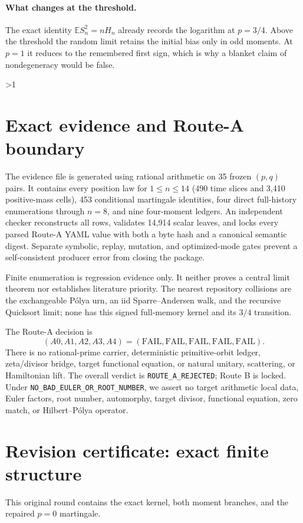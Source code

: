 \documentclass[9pt]{extarticle}
\newcommand{\E}{\mathbb E}
\begin{document}
\paragraph{What changes at the threshold.}
The exact identity $\E S_n^2=nH_n$ already records the logarithm at
$p=3/4$.  Above the threshold the random limit retains the initial bias
only in odd moments.  At $p=1$ it reduces to the remembered first sign,
which is why a blanket claim of nondegeneracy would be false.
\fi

\ifnum\CRevisionRound>1
\section{Exact evidence and Route-A boundary}
The evidence file is generated using rational arithmetic on 35 frozen
$(p,q)$ pairs.  It contains every position law for $1\leq n\leq14$
(490 time slices and 3,410 positive-mass cells), 453 conditional
martingale identities, four direct full-history enumerations through
$n=8$, and nine four-moment ledgers.  An independent checker reconstructs
all rows, validates 14,914 scalar leaves, and locks every parsed Route-A
YAML value with both a byte hash and a canonical semantic digest.
Separate symbolic, replay, mutation, and optimized-mode gates prevent a
self-consistent producer error from closing the package.

Finite enumeration is regression evidence only.  It neither proves a
central limit theorem nor establishes literature priority.  The nearest
repository collisions are the exchangeable P\'olya urn, an iid
Sparre--Andersen walk, and the recursive Quicksort limit; none has this
signed full-memory kernel and its $3/4$ transition.

The Route-A decision is
\[
 (A0,A1,A2,A3,A4)=(\mathrm{FAIL},\mathrm{FAIL},\mathrm{FAIL},
 \mathrm{FAIL},\mathrm{FAIL}).
\]
There is no rational-prime carrier, deterministic primitive-orbit ledger,
zeta/divisor bridge, target functional equation, or natural unitary,
scattering, or Hamiltonian lift.  The overall verdict is
\texttt{ROUTE\_A\_REJECTED}; Route B is locked.  Under
\texttt{NO\_BAD\_EULER\_OR\_ROOT\_NUMBER}, we assert no target arithmetic
local data, Euler factors, root number, automorphy, target divisor,
functional equation, zero match, or Hilbert--P\'olya operator.
\fi

\ifcase\CRevisionRound
\section*{Revision certificate: exact finite structure}
This original round contains the exact kernel, both moment branches, and
the repaired $p=0$ martingale.
\or
\end{document}
